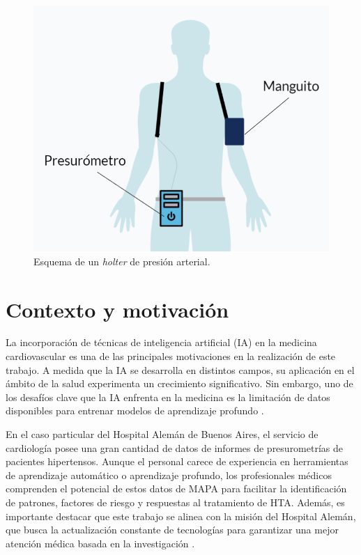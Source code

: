 \begin{figure}[h]
  \centering
  \includegraphics[width=.7\textwidth]{./Figures/presurometro.png}
  \caption{Esquema de un \textit{holter} de presión arterial.}
  \label{fig:holter}
\end{figure}


\section{Contexto y motivación}

La incorporación de técnicas de inteligencia artificial (IA) en la medicina cardiovascular es una de las principales 
motivaciones en la realización de este trabajo. A medida que la IA se desarrolla en distintos campos, su aplicación 
en el ámbito de la salud experimenta un crecimiento significativo. Sin embargo, uno de los desafíos clave que la IA 
enfrenta en la medicina es la limitación de datos disponibles para entrenar modelos de aprendizaje profundo \citep{CITE:8}.

En el caso particular del Hospital Alemán de Buenos Aires, el servicio de cardiología posee una gran cantidad de 
datos de informes de presurometrías de pacientes hipertensos. Aunque el personal carece de experiencia en herramientas 
de aprendizaje automático o aprendizaje profundo, los profesionales médicos comprenden el potencial de estos datos de 
MAPA para facilitar la identificación de patrones, factores de riesgo y respuestas al tratamiento de HTA. Además, 
es importante destacar que este trabajo se alinea con la misión del Hospital Alemán, que busca la actualización constante 
de tecnologías para garantizar una mejor atención médica basada en la investigación \citep{CITE:9}. 


